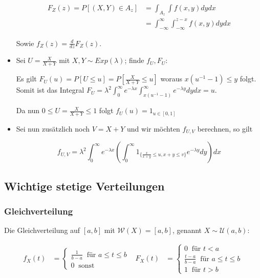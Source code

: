 \documentclass[25pt]{sciposter}
\newcommand{\W}{\mathcal{W}}
\newcommand{\U}{\mathcal{U}}
\begin{document}
\begin{multicols}{3}
\begin{itemize}
	\begin{align*}
	F_Z(z) = P[(X,Y)\in A_z] &= \int_{A_z} \int f(x,y) dy dx\\
	&= \int_{-\infty}^{\infty} \int_{-\infty}^{z-x} f(x,y) dy dx
	\end{align*}
	
	Sowie $f_Z(z) = \frac{d}{dz} F_Z(z)$.
	
	
\item Sei $U = \frac{X}{X+Y}$ mit $X,Y\sim Exp(\lambda)$; finde $f_U, F_U$:

Es gilt $F_U(u) = P[U \leq u] = P[\frac{X}{X+Y}\leq u]$ woraus $x(u^{-1} -1)\leq y$ folgt.
Somit ist das Integral $F_U = \lambda^2 \int_{0}^{\infty} e^{-\lambda x} \int_{x(u^{-1} -1)}^{\infty} e^{-\lambda y} dy dx = u$.

Da nun $0 \leq U = \frac{X}{X+Y} \leq 1$ folgt $f_U(u) = 1_{u\in[0,1]}$

\item Sei nun zusätzlich noch $V=X+Y$ und wir möchten $f_{U,V}$ berechnen, so gilt

$$f_{U,V} = \lambda^2 \int_{0}^{\infty} e^{-\lambda x} \left(\int_{0}^{\infty} 1_{\{\frac{x}{x+y}\leq u, x+y \leq v\}} e^{-\lambda y}dy \right) dx$$

\end{itemize}





\subsection*{Wichtige stetige Verteilungen}

\subsubsection*{Gleichverteilung}
Die Gleichverteilung auf $[a,b]$ mit $\W(X)=[a,b]$, genannt $X\sim\U(a,b)$:

\begin{align*}
	f_X(t) &= \begin{cases}
	\frac{1}{b-a} \ \text{ für } a \leq t \leq b\\
	0 \ \text{ sonst}
	\end{cases}
	& 
	F_X(t) &= \begin{cases}
	0 \ \text{ für } t<a \\
	\frac{t-a}{b-a} \ \text{ für } a \leq t \leq b\\
	1 \ \text{ für } t > b
	\end{cases}
\end{align*}



\end{multicols}
\end{document}
